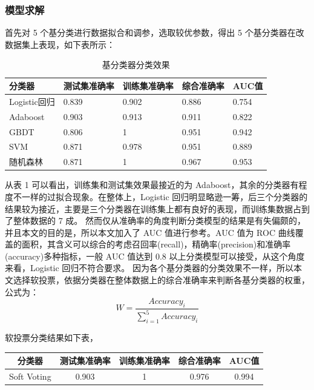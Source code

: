 \documentclass[UTF8]{ctexart}
\begin{document}
\subsubsection{模型求解}

首先对 5 个基分类进行数据拟合和调参，选取较优参数，得出 5 个基分类器在改数据集上表现，如下表所示：
\begin{table}[!ht]
	\centering
	\caption{基分类器分类效果}
	\begin{tabular}{|l|l|l|l|l|}
		\hline
		分类器       & 测试集准确率 & 训练集准确率 & 综合准确率 & AUC值 \\ \hline
		Logistic回归 & 0.839        & 0.902        & 0.886      & 0.754 \\ \hline
		Adaboost     & 0.903        & 0.913        & 0.911      & 0.822 \\ \hline
		GBDT         & 0.806        & 1            & 0.951      & 0.942 \\ \hline
		SVM          & 0.871        & 0.978        & 0.951      & 0.889 \\ \hline
		随机森林     & 0.871        & 1            & 0.967      & 0.953 \\ \hline
	\end{tabular}
\end{table}

从表 1 可以看出，训练集和测试集效果最接近的为 Adaboost，其余的分类器有程度不一样的过拟合现象。在整体上，Logistic 回归明显略逊一筹，后三个分类器的结果较为接近，主要是三个分类器在训练集上都有良好的表现，而训练集数据占到了整体数据的 7 成。
然而仅从准确率的角度判断分类模型的结果是有失偏颇的，并且本文的目的是，所以本文加入了 AUC 值进行参考。AUC 值为 ROC 曲线覆盖的面积，其含义可以综合的考虑召回率(recall)，精确率(precision)和准确率(accuracy)多种指标，一般 AUC 值达到 0.8 以上分类模型可以接受，从这个角度来看，Logistic 回归不符合要求。
因为各个基分类器的分类效果不一样，所以本文选择软投票，依据分类器在整体数据上的综合准确率来判断各基分类器的权重，公式为：
\begin{equation}
	W=\frac{Accuracy_i}{\sum^{5}_{i=1}Accuracy_i}
\end{equation}

软投票分类结果如下表，
\begin{table}[!ht]
	\centering
	\begin{tabular}{c c c c c}
		\hline
		分类器      & 测试集准确率 & 训练集准确率 & 综合准确率 & AUC值 \\ \hline
		Soft Voting & 0.903        & 1            & 0.976      & 0.994 \\ \hline
	\end{tabular}
\end{table}
\end{document}
